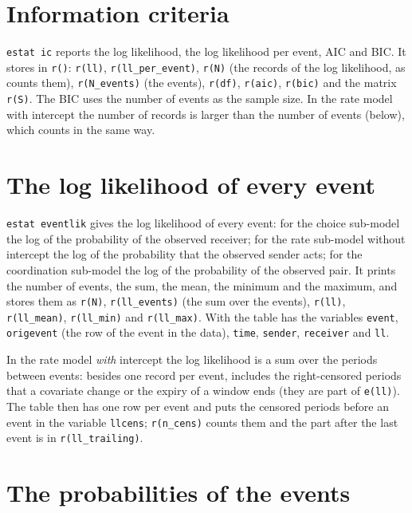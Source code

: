 \section{Information criteria}

\texttt{estat ic} reports the log likelihood, the log likelihood per event, AIC and BIC. It stores in \texttt{r()}: \texttt{r(ll)}, \texttt{r(ll\_per\_event)}, \texttt{r(N)} (the records of the log likelihood, as \goldfish{} counts them), \texttt{r(N\_events)} (the events), \texttt{r(df)}, \texttt{r(aic)}, \texttt{r(bic)} and the matrix \texttt{r(S)}. The BIC uses the number of events as the sample size. In the rate model with intercept the number of records is larger than the number of events (below), which \goldfish{} counts in the same way.

\section{The log likelihood of every event}

\texttt{estat eventlik} gives the log likelihood of every event: for the choice sub-model the log of the probability of the observed receiver; for the rate sub-model without intercept the log of the probability that the observed sender acts; for the coordination sub-model the log of the probability of the observed pair. It prints the number of events, the sum, the mean, the minimum and the maximum, and stores them as \texttt{r(N)}, \texttt{r(ll\_events)} (the sum over the events), \texttt{r(ll)}, \texttt{r(ll\_mean)}, \texttt{r(ll\_min)} and \texttt{r(ll\_max)}. With  the table has the variables \texttt{event}, \texttt{origevent} (the row of the event in the data), \texttt{time}, \texttt{sender}, \texttt{receiver} and \texttt{ll}.

In the rate model \emph{with} intercept the log likelihood is a sum over the periods between events: besides one record per event, \goldfish{} includes the right-censored periods that a covariate change or the expiry of a window ends (they are part of \texttt{e(ll)}). The table then has one row per event and puts the censored periods before an event in the variable \texttt{llcens}; \texttt{r(n\_cens)} counts them and the part after the last event is in \texttt{r(ll\_trailing)}.

\section{The probabilities of the events}

